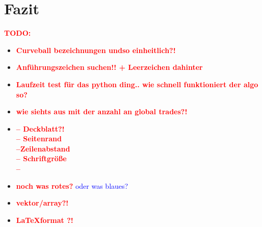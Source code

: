 \documentclass[a4paper,twoside, 11pt, openright]{scrbook}
\theoremstyle{plain} %
\theoremstyle{definition} %
\newcommand{\cb}{Curveball}
\newcommand{\red}[1]{\textcolor{red}{\textbf{#1}}}
\newcommand{\blue}[1]{\textcolor{blue}{#1}}
\begin{document}
\chapter{Fazit}




\newpage
\red{\Huge TODO:}
\begin{itemize}
	\item \red{\Large \cb{} bezeichnungen undso einheitlich?!}
	\item \red{\Large Anführungszeichen suchen!! + Leerzeichen dahinter}
	\item \red{\huge Laufzeit test für das python ding.. wie schnell funktioniert der algo so?}
	\item \red{wie siehts aus mit der anzahl an global trades?!}
	\item \red{\Large -- Deckblatt?! \\ -- Seitenrand \\ --Zeilenabstand \\ -- Schriftgröße \\ --}
	\item \red{noch was rotes?} \blue{oder was blaues?}
	\item \red{vektor/array?!}
	\item \red{\LaTeX format ?!}
\end{itemize}













\listoffigures{}
\listoftables{}
\end{document}
